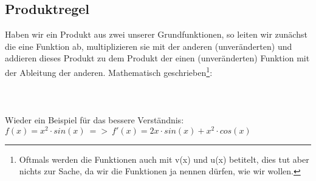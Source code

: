 \subsection{Produktregel}
	Haben wir ein Produkt aus zwei unserer Grundfunktionen, so leiten wir zunächst
	die eine Funktion ab, multiplizieren sie mit der anderen (unveränderten) und
	addieren dieses Produkt zu dem Produkt der einen (unveränderten) Funktion mit
	der Ableitung der anderen. Mathematisch geschrieben\footnote{Oftmals werden die
	Funktionen auch mit v(x) und u(x) betitelt, dies tut aber nichts zur Sache, da
	wir die Funktionen ja nennen dürfen, wie wir wollen.}:
	\\ \\
	\formel{\[h'(x)=(f(x)\cdot g(x))' = f'(x)\cdot g(x)+f(x)\cdot g'(x)\]}
	\\ \\
	Wieder ein Beispiel für das bessere Verständnis: \(f(x)=x^2\cdot sin(x)\ =>\
	f'(x)=2x\cdot sin(x)+x^2\cdot cos(x)\)
	
